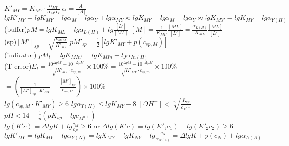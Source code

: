 \documentclass[10pt,twocolumn]{article}
\begin{document}
    \(K'_{MY}=K_{MY}\cdot \frac{\alpha_{MY}}{\alpha_M \alpha_Y}\) \quad
    \(\alpha = \frac{{A'}}{[A]}\) \\
    \(lgK'_{MY}=lgK_{MY}-lg \alpha_M - lg \alpha_Y+lg \alpha_{MY} \approx lgK_{MY}-lg \alpha_M - lg \alpha_Y \approx lgK_{MY'} = lgK_{MY} - lg\alpha_{Y(H)}\) \\
    (buffer)\(pM=lgK_{ML}-lg\alpha_{L(H)}+lg\frac{[L']}{[ML]}\)\quad
    \([M] = \frac{1}{K_{ML'}}\frac{[ML]}{[L']} = \frac{\alpha_{L(H)}}{K_{ML}}\frac{[ML]}{[L']}\) \\
    (sp)\([M']_{sp}=\sqrt{\frac{c_{sp,M}}{K'_{MY}}}\) \quad
    \(pM'_{sp} = \frac{1}{2}[lgK'_{MY}+p(c_{sp,M})]\) \\
    (indicator) \(pM_t = lg K_{MIn'} = lgK_{MIn} - lg \alpha_{In(H)}\) \\
    (T error)\(E_t = \frac{10^{\Delta pM'}-10^{-\Delta pM'}}{\sqrt{K'_{MY}\cdot c_{sp,m}}} \times 100\% = \frac{10^{\Delta pM}-10^{-\Delta pM}}{\sqrt{K'_{MY}\cdot c_{sp,m}}} \times 100\% \)\\
    \(= (\frac{1}{[M']_{ep}\cdot K'_{MY}}-\frac{[M']_{ep}}{c_{sp,M}}) \times 100 \%\) \\
    \(lg(c_{sp,M}\cdot K'_{MY}) \geq 6\) \quad
    \(lg\alpha_{Y(H)} \leq lgK_{MY} - 8 \) \quad
    \([OH^-] < \sqrt[n]{\frac{K_{sp}}{c_{M^{n+}}}}\) \\
    \(pH < 14 - \frac{1}{n}(pK_{sp}+lgc_{M^{n+}})\) \\
    \(lg(K'c) = \Delta lgK + lg\frac{c_M}{c_N} \geq 6\) or
    \(\Delta lg(K'c) = lg(K'_1 c_1)-lg(K'_2 c_2) \geq 6\) \\
    \(lgK'_{MY} = lgK_{MY} - lg \alpha_{Y(N)} = lgK_{MY} - lgK_{NY} - lg\frac{c_N}{\alpha_{N(A)}} = \Delta lgK + p(c_N) + lg \alpha_{N(A)}\)
\end{document}
